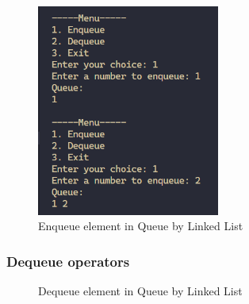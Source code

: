 \begin{figure}[H]
    \centering
    \includegraphics[width=6cm]{img/img13.PNG}
    \caption{Enqueue element in Queue by Linked List}
    \label{fig:QueueLinkedListEnqueue}
\end{figure}

\subsubsection{Dequeue operators}
\begin{figure}[H]
    \centering
    \qquad
    \caption{Dequeue element in Queue by Linked List}%
    \label{fig:queueLinkedListDequeue}%
\end{figure}
\newpage
